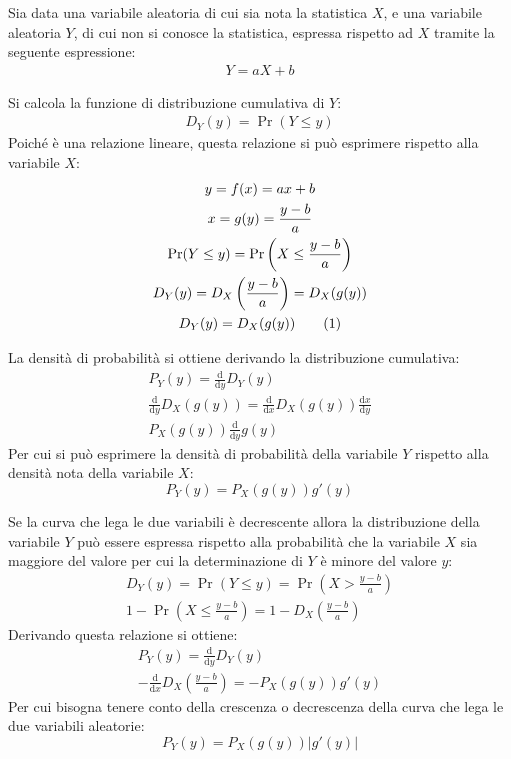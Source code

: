 \documentclass{article}
\newcommand{\df}{\mathrm{d}}
\newcommand{\tageq}{\tag{\stepcounter{equation}\theequation}}
\numberwithin{equation}{subsection}
\begin{document}
Sia data una variabile aleatoria di cui sia nota la statistica $X$, e una variabile aleatoria $Y$, di cui non si conosce la statistica, espressa rispetto ad $X$ tramite la 
seguente espressione:
\begin{gather*}
    Y=aX+b
\end{gather*}

Si calcola la funzione di distribuzione cumulativa di $Y$:
\begin{gather*}
    D_Y(y)=\Pr(Y\leq y)
\end{gather*}
Poiché è una relazione lineare, questa relazione si può esprimere rispetto alla variabile $X$:
\begin{gather*}
    y=f(x)=ax+b\\
    x=g(y)=\displaystyle\frac{y-b}{a}\\
    \Pr(Y\leq y)=\Pr\left(X\leq\displaystyle\frac{y-b}{a}\right)\\
    D_Y(y)=D_X\left(\displaystyle\frac{y-b}{a}\right)=D_X(g(y))\\
    D_Y(y)=D_X(g(y))\tageq
\end{gather*}

La densità di probabilità si ottiene derivando la distribuzione cumulativa:
\begin{gather*}
    P_Y(y)=\displaystyle\frac{\df}{\df y}D_Y(y)\\
    \frac{\df}{\df y}D_X(g(y))=\frac{\df}{\df x}D_X(g(y))\frac{\df x}{\df y}\\ %
    P_X(g(y))\frac{\df}{\df y}g(y)
\end{gather*}
Per cui si può esprimere la densità di probabilità della variabile $Y$ rispetto alla densità nota della variabile $X$:
\begin{equation*}
    P_Y(y)=P_X(g(y))g'(y)
\end{equation*}

Se la curva che lega le due variabili è decrescente allora la distribuzione della variabile $Y$ può essere espressa rispetto alla probabilità che la variabile $X$ sia 
maggiore del valore per cui la determinazione di $Y$ è minore del valore $y$: 
\begin{gather*}
    D_Y(y)=\Pr(Y\leq y)=\Pr\left(\displaystyle X>\frac{y-b}{a}\right)\\
    1-\Pr\left(X\leq\frac{y-b}{a}\right)=1-D_X\left(\frac{y-b}{a}\right)
\end{gather*}
Derivando questa relazione si ottiene:
\begin{gather*}
    P_Y(y)=\displaystyle\frac{\df}{\df y}D_Y(y)\\
    -\displaystyle\frac{\df}{\df x}D_X\left(\frac{y-b}{a}\right)=-P_X(g(y))g'(y)
\end{gather*}
Per cui bisogna tenere conto della crescenza o decrescenza della curva che lega le due variabili aleatorie:
\begin{equation}
    P_Y(y)=P_X(g(y))\left|g'(y)\right|
\end{equation}
\end{document}
